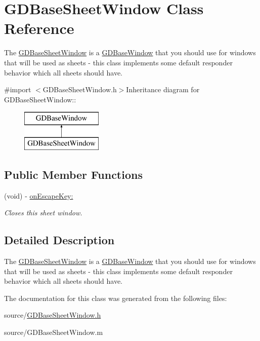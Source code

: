 \hypertarget{interface_g_d_base_sheet_window}{
\section{GDBaseSheetWindow Class Reference}
\label{interface_g_d_base_sheet_window}
}


The \hyperlink{interface_g_d_base_sheet_window}{GDBaseSheetWindow} is a \hyperlink{interface_g_d_base_window}{GDBaseWindow} that you should use for windows that will be used as sheets -\/ this class implements some default responder behavior which all sheets should have.  


{\ttfamily \#import $<$GDBaseSheetWindow.h$>$}Inheritance diagram for GDBaseSheetWindow::\begin{figure}[H]
\begin{center}
\leavevmode
\includegraphics[height=2cm]{interface_g_d_base_sheet_window}
\end{center}
\end{figure}
\subsection*{Public Member Functions}
\begin{DoxyCompactItemize}
\item 
\hypertarget{interface_g_d_base_sheet_window_ab5fadb3f9486fd8d290f56a4407d2b35}{
(void) -\/ \hyperlink{interface_g_d_base_sheet_window_ab5fadb3f9486fd8d290f56a4407d2b35}{onEscapeKey:}}
\label{interface_g_d_base_sheet_window_ab5fadb3f9486fd8d290f56a4407d2b35}

\begin{DoxyCompactList}\small\item\em Closes this sheet window. \item\end{DoxyCompactList}\end{DoxyCompactItemize}


\subsection{Detailed Description}
The \hyperlink{interface_g_d_base_sheet_window}{GDBaseSheetWindow} is a \hyperlink{interface_g_d_base_window}{GDBaseWindow} that you should use for windows that will be used as sheets -\/ this class implements some default responder behavior which all sheets should have. 

The documentation for this class was generated from the following files:\begin{DoxyCompactItemize}
\item 
source/\hyperlink{_g_d_base_sheet_window_8h}{GDBaseSheetWindow.h}\item 
source/GDBaseSheetWindow.m\end{DoxyCompactItemize}
